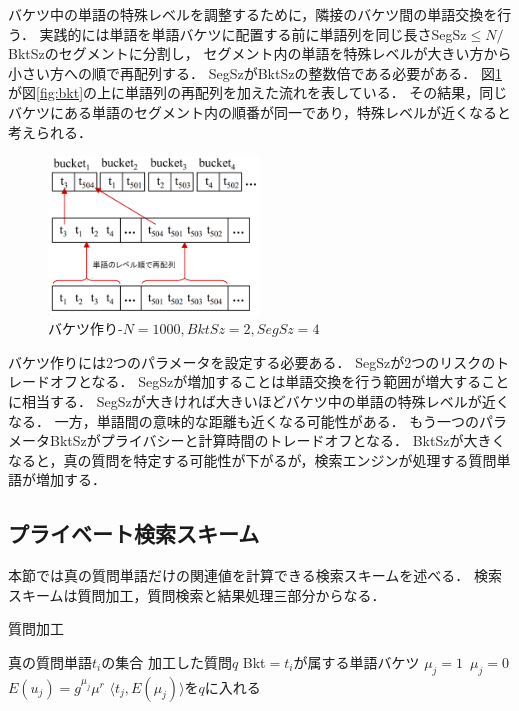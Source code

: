 \documentclass[master]{suribt}
\theoremstyle{definition}
\begin{document}
 バケツ中の単語の特殊レベルを調整するために，隣接のバケツ間の単語交換を行う．
 実践的には単語を単語バケツに配置する前に単語列を同じ長さSegSz$\leq N/$BktSzのセグメントに分割し，
 セグメント内の単語を特殊レベルが大きい方から小さい方への順で再配列する．
 SegSzがBktSzの整数倍である必要がある．
 図\ref{fig:bkt2}が図\ref{fig:bkt}の上に単語列の再配列を加えた流れを表している．
 その結果，同じバケツにある単語のセグメント内の順番が同一であり，特殊レベルが近くなると考えられる．

 \begin{figure}
  \centering
  \includegraphics[width=0.5\textwidth,height=0.3\textwidth,natwidth=1600,natheight=1196]{rk13.png}
  \caption{バケツ作り-$N=1000,BktSz=2,SegSz=4$}\label{fig:bkt2}
 \end{figure}

 バケツ作りには2つのパラメータを設定する必要ある．
 SegSzが2つのリスクのトレードオフとなる．
 SegSzが増加することは単語交換を行う範囲が増大することに相当する．
 SegSzが大きければ大きいほどバケツ中の単語の特殊レベルが近くなる．
 一方，単語間の意味的な距離も近くなる可能性がある．
 もう一つのパラメータBktSzがプライバシーと計算時間のトレードオフとなる．
 BktSzが大きくなると，真の質問を特定する可能性が下がるが，検索エンジンが処理する質問単語が増加する．
 
 \subsection{プライベート検索スキーム}
 本節では真の質問単語だけの関連値を計算できる検索スキームを述べる．
 検索スキームは質問加工，質問検索と結果処理三部分からなる．

 \begin{algorithm}
 \caption{質問加工}
 \begin{algorithmic}[1]
  \Require 真の質問単語$t_i$の集合
  \Ensure 加工した質問$q$
   \State Bkt$=t_i$が属する単語バケツ
     $\mu_j=1$
    \Else $\,\mu_j=0$
    \EndIf
    \State $E(u_j) = g^{\mu_j}\mu^r$
    \State $\langle t_j,E(\mu_j)\rangle$を$q$に入れる
   \EndFor
  \EndFor
 \EndFunction
 \end{algorithmic}
 \label{a:qe}
 \end{algorithm}
\end{document}
